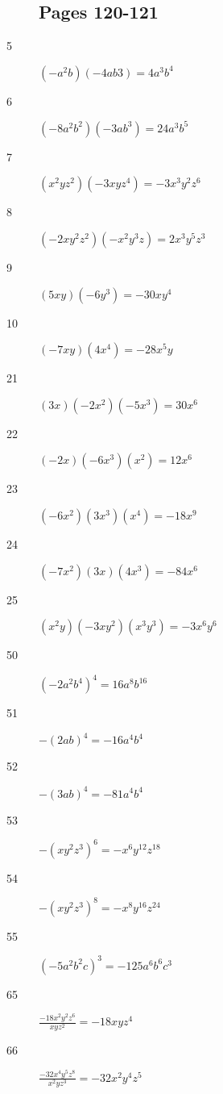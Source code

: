 \documentclass[fleqn,addpoints]{exam}
\begin{document}
\begin{description}
\subsection{Pages 120-121}

\item[5]
\( (-a^2b)(-4ab3) = 4a^3b^4 \)

\item[6]
\( (-8a^2b^2)(-3ab^3) = 24a^3b^5 \)

\item[7]
\( (x^2yz^2)(-3xyz^4) = -3x^3y^2z^6 \)

\item[8]
\( (-2xy^2z^2)(-x^2y^3z) = 2x^3y^5z^3 \)

\item[9]
\( (5xy)(-6y^3) = -30xy^4 \)

\item[10]
\( (-7xy)(4x^4) = -28x^5y \)

\item[21]
\( (3x)(-2x^2)(-5x^3) = 30x^6 \)

\item[22]
\( (-2x)(-6x^3)(x^2) = 12x^6 \)

\item[23]
\( (-6x^2)(3x^3)(x^4) = -18x^9 \)

\item[24]
\( (-7x^2)(3x)(4x^3) = -84x^6 \)

\item[25]
\( (x^2y)(-3xy^2)(x^3y^3) = -3x^6y^6 \)

\item[50]
\( (-2a^2b^4)^4 = 16a^8b^{16} \)

\item[51]
\( -(2ab)^4 = -16a^4b^4 \)

\item[52]
\( -(3ab)^4 = -81a^4b^4 \)

\item[53]
\( -(xy^2z^3)^6 = -x^6y^{12}z^{18} \)

\item[54]
\( -(xy^2z^3)^8 = -x^8y^{16}z^{24} \)

\item[55]
\( (-5a^2b^2c)^3 = -125a^6b^6c^3 \)

\item[65]
\( \displaystyle \frac{-18x^2y^2z^6}{xyz^2} = -18xyz^4\)

\item[66]
\( \displaystyle \frac{-32x^4y^5z^8}{x^2yz^3} = -32x^2y^4z^5 \)


\end{description}
\end{document}
